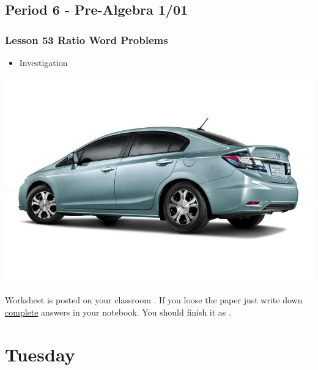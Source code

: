    	 \subsection[PA1/01]{Period 6 - Pre-Algebra 1/01}
   	   \begin{frame}[label=PA1_01]
   	 	  	\frametitle{Lesson 53 Ratio Word Problems}

   	 	  	\begin{itemize}
   	 	  		\item {} Investigation
   	 	  	\end{itemize}
   	 	  	\vspace{-20pt}
   	 	  	\begin{center}
   	 	  		\includegraphics[width=0.5\linewidth]{Images/honda_civic}
   	 	  	\end{center}
   	 	  	\vspace{-20pt}
   	 	  	\begin{alertblock}{}
   	 	  		Worksheet is posted on your  classroom .
   	 	  		If you loose the paper just write down \underline{complete} answers in your notebook. You should finish it as .
   	 	  	\end{alertblock}
   	 	  \end{frame}

   	 \section[Tue]{Tuesday}
